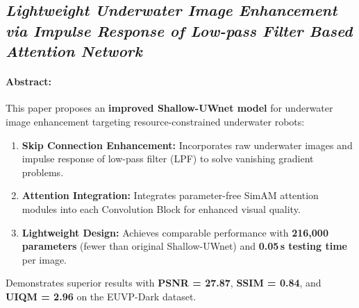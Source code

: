 \subsection{\textit{Lightweight Underwater Image Enhancement via Impulse Response of Low-pass Filter Based Attention Network\cite{Tun_2024}}}

\paragraph{Abstract:}
This paper proposes an \textbf{improved Shallow-UWnet model} for underwater image enhancement targeting resource-constrained underwater robots:
\begin{enumerate}
    \item \textbf{Skip Connection Enhancement:} Incorporates raw underwater images and impulse response of low-pass filter (LPF) to solve vanishing gradient problems.
    \item \textbf{Attention Integration:} Integrates parameter-free SimAM attention modules into each Convolution Block for enhanced visual quality.
    \item \textbf{Lightweight Design:} Achieves comparable performance with \textbf{216,000 parameters} (fewer than original Shallow-UWnet) and \textbf{0.05\,s testing time} per image.
\end{enumerate}
Demonstrates superior results with \textbf{PSNR = 27.87}, \textbf{SSIM = 0.84}, and \textbf{UIQM = 2.96} on the EUVP-Dark dataset.


